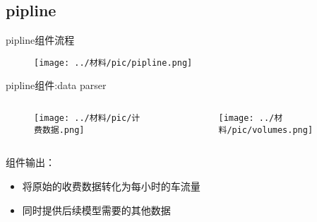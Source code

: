 \documentclass[notheorems, aspectratio=1610]{beamer}
\begin{document}
\subsection{pipline}
\begin{frame}
    \Large pipline组件流程
    \newline
    \begin{figure}[h] %
        \centering %
        \texttt{[image: ../材料/pic/pipline.png]} %
    \end{figure}%
\end{frame}
\begin{frame}
    \Large pipline组件:data parser
    \newline
    \begin{columns}
        \begin{column}{0.5\textwidth}
            \begin{figure}[h] %
                \centering %
                \texttt{[image: ../材料/pic/计费数据.png]} %
            \end{figure}%
        \end{column}
        \begin{column}{0.5\textwidth}
            \begin{figure}[h] %
                \centering %
                \texttt{[image: ../材料/pic/volumes.png]} %
            \end{figure}%
        \end{column}
    \end{columns}
    \normalsize 组件输出：
    \begin{itemize}
        \item 将原始的收费数据转化为每小时的车流量
        \item 同时提供后续模型需要的其他数据
    \end{itemize}
\end{frame}
\end{document}
